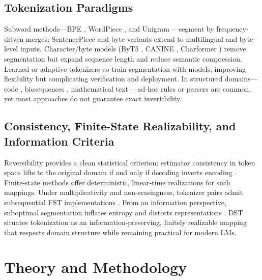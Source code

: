 \subsection{Tokenization Paradigms}

Subword methods—BPE \citep{gage1994bpe}, WordPiece \citep{wu2016google}, and Unigram \citep{kudo2018sentencepiece}—segment by frequency-driven merges; SentencePiece and byte variants \citep{radford2019gpt2} extend to multilingual and byte-level inputs. Character/byte models (ByT5 \citep{xue2022byt5}, CANINE \citep{clark2022canine}, Charformer \citep{tay2022charformer}) remove segmentation but expand sequence length and reduce semantic compression. Learned or adaptive tokenizers \citep{taylor2021learned, kaufman2023soft, wang2023neural, huang2023adapttok} co-train segmentation with models, improving flexibility but complicating verification and deployment. In structured domains—code \citep{feng2020codebert, wang2021codet5, ahmad2021unified}, biosequences \citep{ji2021dnabert, zhou2023proteinbert}, mathematical text \citep{han2023mathbert}—ad‑hoc rules or parsers are common, yet most approaches do not guarantee exact invertibility.

\subsection{Consistency, Finite-State Realizability, and Information Criteria}

Reversibility provides a clean statistical criterion: estimator consistency in token space lifts to the original domain if and only if decoding inverts encoding \citep{wei2025tokenizer}. Finite‑state methods \citep{mohri1997finite, mohri2004weighted, beesley2003finite} offer deterministic, linear‑time realizations for such mappings. Under multiplicativity and non‑erasingness, tokenizer pairs admit subsequential FST implementations \citep{choffrut1979sequential}. From an information perspective, suboptimal segmentation inflates entropy and distorts representations \citep{brown1992statistical, shannon1948mathematical, bostrom2020byte, ramesh2021tokenization, liu2024tokeneval}. DST situates tokenization as an information‑preserving, finitely realizable mapping that respects domain structure while remaining practical for modern LMs.

\section{Theory and Methodology}
\label{sec:theory}

